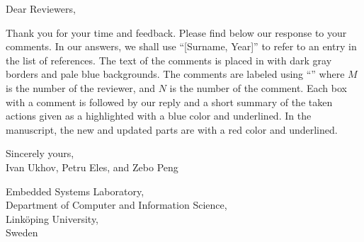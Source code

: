 Dear Reviewers,

\vspace{2.5em}
\noindent Thank you for your time and feedback. Please find below our response
to your comments. In our answers, we shall use ``[Surname, Year]'' to refer to
an entry in the list of references. The text of the comments is placed in
 with dark gray borders and pale blue backgrounds. The
comments are labeled using ``'' where $M$ is the number of the
reviewer, and $N$ is the number of the comment. Each box with a comment is
followed by our reply and a short summary of the taken actions given as a
 highlighted with a blue color and underlined. In the
manuscript, the new and updated parts are  with a red color and
underlined.

\vspace{2.5em}
\noindent Sincerely yours,\\
Ivan Ukhov, Petru Eles, and Zebo Peng

\vspace{1em}
\noindent Embedded Systems Laboratory,\\
Department of Computer and Information Science,\\
Link\"{o}ping University,\\
Sweden

$ $
